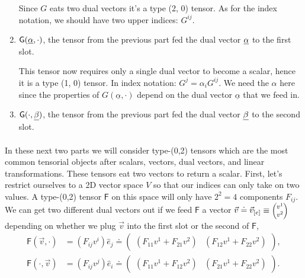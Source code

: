 \documentclass{article}
\begin{document}
\begin{enumerate}
			\begin{solution}
				Since $G$ eats two dual vectors it's a type (2, 0) tensor. As for the index notation, we should
				have two upper indices: $G^{ij}$. 
			\end{solution}
		\item $\mathsf{G}(\underline{\alpha},\cdot)$, the tensor from the previous part fed the dual vector $\underline{\alpha}$ to the first slot.

			\begin{solution}
				This tensor now requires only a single dual vector to become a scalar, hence it is a type (1, 0)
				tensor. In index notation: $G^j = \alpha_i G^{ij}$. We need the $\alpha$ here since the 
				properties of $G(\underline \alpha, \cdot)$ depend on the dual vector $\underline \alpha$ that
				we feed in.
			\end{solution}
		\item {} $\mathsf{G}(\cdot,\underline{\beta})$, the tensor from the previous part fed the dual vector $\underline{\beta}$ to the second slot.
	\end{enumerate}


\phline
\paragraph{}
In these next two parts we will consider type-(0,2) tensors which are the most common tensorial objects after scalars, vectors, dual vectors, and linear transformations.  
These tensors eat two vectors to return a scalar.  
First, let's restrict ourselves to a 2D vector space $V$ so that our indices can only take on two values.  A type-(0,2) tensor $\mathsf{F}$ on this space will only have $2^{2}=4$ 
components $F_{ij}$.  We can get two different dual vectors out if we feed $\mathsf{F}$ a vector $\vec{v}\doteq \vec{v}_{[e]}\equiv\smtwovect{v^{1}}{v^{2}}$ depending
on whether we plug $\vec{v}$ into the first slot or the second of $\mathsf{F}$,
\begin{align}
		\mathsf{F}(\vec{v},\cdot) &= (F_{ij}v^{i})\hat{e}_{j} \doteq \begin{pmatrix}(F_{11}v^{1} + F_{21}v^{2}) & (F_{12}v^{1}+F_{22}v^{2})\end{pmatrix},\label{Fv1}\\
		\mathsf{F}(\cdot,\vec{v}) &= (F_{ij}v^{j})\hat{e}_{i} \doteq \begin{pmatrix}(F_{11}v^{1} + F_{12}v^{2}) & (F_{21}v^{1}+F_{22}v^{2})\end{pmatrix}.\label{Fv2}
	\end{align}
\end{document}
